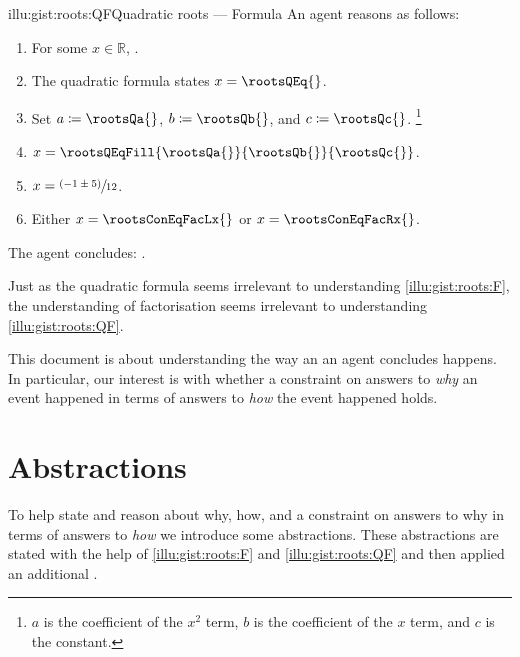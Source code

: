 \begin{note}
  \begin{rscenario}{illu:gist:roots:QF}{Quadratic roots --- Formula}%
    An agent reasons as follows:
    \begin{enumerate}[label=\arabic*., ref=\arabic*]
    \item
      \label{illu:gist:roots:QF:eq}
      For some \(x \in \mathbb{R}\), \rootsConEq{}.
    \item
      \label{illu:gist:roots:QF:qf}
      The quadratic formula states \(x = \rootsQEq{}\).
    \item
      \label{illu:gist:roots:QF:subs}
      Set \(a \coloneq \rootsQa{}\), \(b \coloneq \rootsQb{}\), and \(c \coloneq \rootsQc{}\).%
      \footnote{
        \(a\) is the coefficient of the \(x^{2}\) term, \(b\) is the coefficient of the \(x\) term, and \(c\) is the constant.
      }
    \item
      \label{illu:gist:roots:QF:qf-subs}
      \(x = \rootsQEqFill{\rootsQa{}}{\rootsQb{}}{\rootsQc{}}\).
    \item
      \label{illu:gist:roots:QF:qf:1}
      \(x = \sfrac{(- 1 \pm 5)}{12}\).
    \item
      \label{illu:gist:roots:QF:qf:done}
      Either \(x = \rootsConEqFacLx{}\) or \(x = \rootsConEqFacRx{}\).
    \end{enumerate}
    The agent concludes:
    \rootsCon{}.
  \end{rscenario}

  \noindent%
  Just as the quadratic formula seems irrelevant to understanding \autoref{illu:gist:roots:F}, the \agents{} understanding of factorisation seems irrelevant to understanding \autoref{illu:gist:roots:QF}.
\end{note}


\begin{note}
  This document is about understanding the way an  an agent concludes happens.
  In particular, our interest is with whether a constraint on answers to \emph{why} an event happened in terms of answers to \emph{how} the event happened holds.
\end{note}


\section{Abstractions}


\begin{note}
  To help state and reason about why, how, and a constraint on answers to why in terms of answers to \emph{how} we introduce some abstractions.
  These abstractions are stated with the help of  \ref{illu:gist:roots:F} and \ref{illu:gist:roots:QF} and then applied an additional \scen{}.
\end{note}


